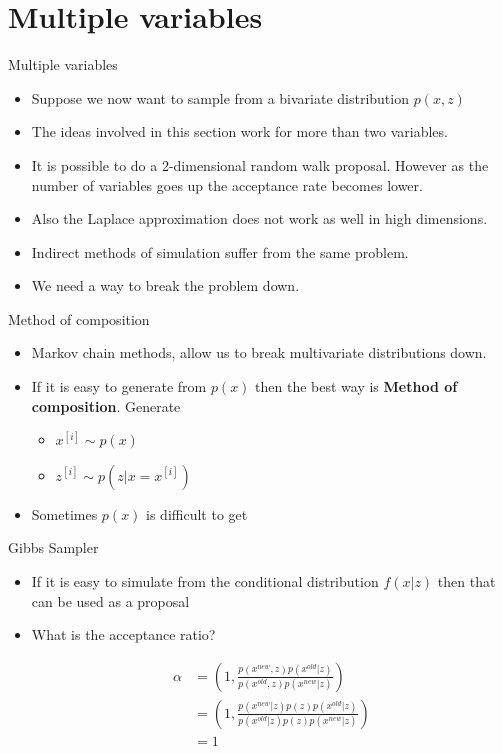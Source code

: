 \documentclass[10pt]{beamer}
\begin{document}
\section{Multiple variables}
\begin{frame}{Multiple variables}
\begin{itemize}
\item Suppose we now want to sample from a bivariate distribution $p(x,z)$

\item The ideas involved in this section work for more than two variables.

\item It is possible to do a 2-dimensional random walk proposal.  However as the number of variables goes up the acceptance rate becomes lower.

\item Also the Laplace approximation does not work as well in high dimensions.

\item Indirect methods of simulation suffer from the same problem.

\item We need a way to break the problem down.
\end{itemize}
\end{frame}
\begin{frame}{Method of composition}
\begin{itemize}
\item Markov chain methods, allow us to break multivariate distributions down.

\item If it is easy to generate from $p(x)$ then the best way is {\bf Method of composition}.  Generate

\begin{itemize}
\item $x^{[i]}\sim p(x)$
\item $z^{[i]}\sim p(z|x=x^{[i]})$
\end{itemize}

\item Sometimes $p(x)$ is difficult to get
\end{itemize}
\end{frame}
\begin{frame}{Gibbs Sampler}
\begin{itemize}
\item If it is easy to simulate from the conditional distribution $f(x|z)$ then that can be used as a proposal

\item What is the acceptance ratio?

\begin{align*}
\alpha&=\left(1,\frac{p(x^{new},z)p(x^{old}|z)}
{p(x^{old},z)p(x^{new}|z)}\right)\\
&=\left(1,\frac{p(x^{new}|z)p(z)p(x^{old}|z)}
{p(x^{old}|z)p(z)p(x^{new}|z)}\right)\\
&=1
\end{align*}
\end{itemize}
\end{frame}
\end{document}
